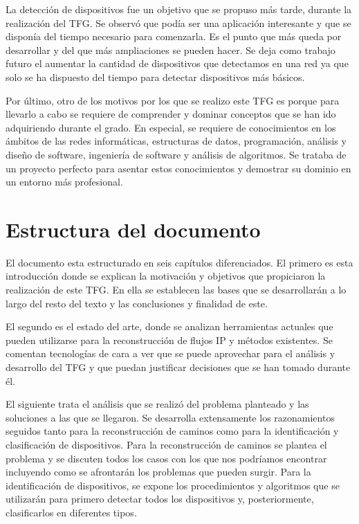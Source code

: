 \documentclass[twoside, 12pt]{epstfg}
\begin{document}
La detección de dispositivos fue un objetivo que se propuso más tarde, durante la realización del TFG. Se observó que podía ser una aplicación interesante y que se disponía del tiempo necesario para comenzarla. Es el punto que más queda por desarrollar y del que más ampliaciones se pueden hacer. Se deja como trabajo futuro el aumentar la cantidad de dispositivos que detectamos en una red ya que solo se ha dispuesto del tiempo para detectar dispositivos más básicos.

Por último, otro de los motivos por los que se realizo este TFG es porque para llevarlo a cabo se requiere de comprender y dominar conceptos que se han ido adquiriendo durante el grado. En especial, se requiere de conocimientos en los ámbitos de las redes informáticas, estructuras de datos, programación, análisis y diseño de software, ingeniería de software y análisis de algoritmos. Se trataba de un proyecto perfecto para asentar estos conocimientos y demostrar su dominio en un entorno más profesional.

\section{Estructura del documento}
El documento esta estructurado en seis capítulos diferenciados. El primero es esta introducción donde se explican la motivación y objetivos que propiciaron la realización de este TFG. En ella se establecen las bases que se desarrollarán a lo largo del resto del texto y las conclusiones y finalidad de este.

El segundo es el estado del arte, donde se analizan herramientas actuales que pueden utilizarse para la reconstrucción de flujos IP y métodos existentes. Se comentan tecnologías de cara a ver que se puede aprovechar para el análisis y desarrollo del TFG y que puedan justificar decisiones que se han tomado durante él.

El siguiente trata el análisis que se realizó del problema planteado y las soluciones a las que se llegaron. Se desarrolla extensamente los razonamientos seguidos tanto para la reconstrucción de caminos como para la identificación y clasificación de dispositivos. Para la reconstrucción de caminos se plantea el problema y se discuten todos los casos con los que nos podríamos encontrar incluyendo como se afrontarán los problemas que pueden surgir. Para la identificación de dispositivos, se expone los procedimientos y algoritmos que se utilizarán para primero detectar todos los dispositivos y, posteriormente, clasificarlos en diferentes tipos.
\end{document}
